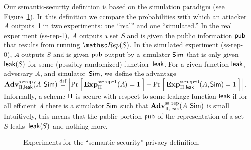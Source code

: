 Our semantic-security definition is based on the simulation paradigm (see Figure~\ref{fig:privacy-ss}).
In this definition we compare the probabilities with which an attacker $A$ outputs~1
in two experiments: one ``real'' and one ``simulated.''
In the real experiment (ss-rep-1), $A$ outputs a set $S$  and is given the
public information ${\sf pub}$ that results from running $\Rep(S)$.
In the simulated experiment (ss-rep-0), $A$ outputs $S$ and is given ${\sf pub}$ output
by a simulator ${\sf Sim}$ that is only given ${\sf leak}(S)$ for some (possibly randomized)
function~${\sf leak}$.
For a given function ${\sf leak}$, adversary $A$, and simulator~${\sf Sim}$,
we define the advantage
$\mathrm{\mathbf{Adv}}^{\mathrm{ss\mbox{-}rep}}_{\Pi,{\sf leak}}(A,{\sf Sim}) \stackrel{\rm def}{=}
\left| \Pr\left[\: \mathrm{\mathbf{Exp}}^{\mathrm{ss\mbox{-}rep\mbox{-}1}}_{\Pi}(A)=1 \:\right] -
\Pr\left[\: \mathrm{\mathbf{Exp}}^{\mathrm{ss\mbox{-}rep\mbox{-}0}}_{\Pi,{\sf leak}}(A, {\sf Sim})=1 \:\right] \right|$.
Informally, a scheme $\Pi$ is secure with respect to some leakage function ${\sf leak}$
if for all efficient $A$ there is a simulator ${\sf Sim}$ such that
$\mathrm{\mathbf{Adv}}^{\mathrm{ss\mbox{-}rep}}_{\Pi,{\sf leak}}(A,{\sf Sim})$ is small.
Intuitively, this means that the public portion
${\sf pub}$ of the representation of a set~$S$ leaks~${\sf leak}(S)$ and nothing more.
\begin{figure}[tp]
\centering
{}
\caption{Experiments for the ``semantic-security'' privacy
  definition.}
\label{fig:privacy-ss}
\end{figure}



